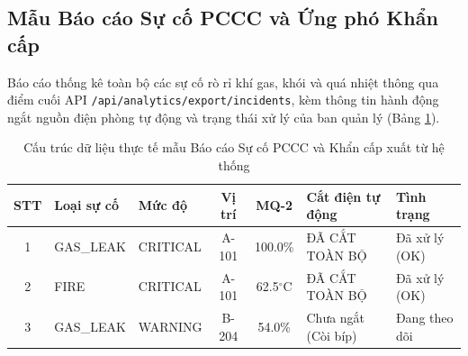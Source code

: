 \subsection{Mẫu Báo cáo Sự cố PCCC và Ứng phó Khẩn cấp}
Báo cáo thống kê toàn bộ các sự cố rò rỉ khí gas, khói và quá nhiệt thông qua điểm cuối API \texttt{/api/analytics/}\linebreak\texttt{export/incidents}, kèm thông tin hành động ngắt nguồn điện phòng tự động và trạng thái xử lý của ban quản lý (Bảng \ref{tab:mau_bao_cao_suco}).

\begin{table}[H]
\centering
\footnotesize
\begin{tabularx}{\textwidth}{|c|p{2.2cm}|p{1.8cm}|c|c|X|p{2.4cm}|}
\hline
\textbf{STT} & \textbf{Loại sự cố} & \textbf{Mức độ} & \textbf{Vị trí} & \textbf{MQ-2} & \textbf{Cắt điện tự động} & \textbf{Tình trạng} \\
\hline
1 & GAS\_LEAK & CRITICAL & A-101 & 100.0\% & ĐÃ CẮT TOÀN BỘ & Đã xử lý (OK) \\
\hline
2 & FIRE & CRITICAL & A-101 & 62.5$^\circ\text{C}$ & ĐÃ CẮT TOÀN BỘ & Đã xử lý (OK) \\
\hline
3 & GAS\_LEAK & WARNING & B-204 & 54.0\% & Chưa ngắt (Còi bíp) & Đang theo dõi \\
\hline
\end{tabularx}
\caption{Cấu trúc dữ liệu thực tế mẫu Báo cáo Sự cố PCCC và Khẩn cấp xuất từ hệ thống}
\label{tab:mau_bao_cao_suco}
\end{table}

\newpage
